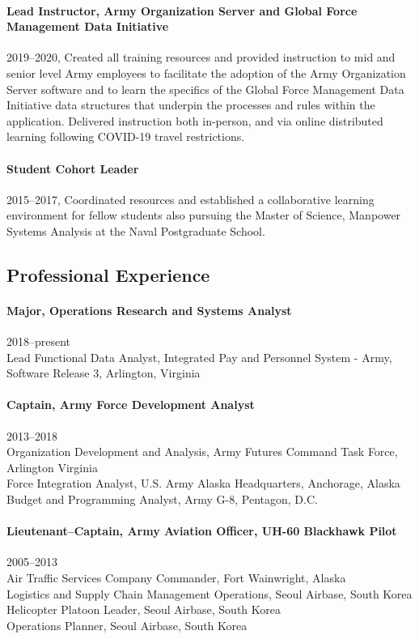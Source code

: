 \documentclass[12pt,letterpaper]{article}
\begin{document}
\paragraph{Lead Instructor, Army Organization Server and Global Force Management Data Initiative} 2019--2020, Created all training resources and provided instruction to mid and senior level Army employees to facilitate the adoption of the Army Organization Server software and to learn the specifics of the Global Force Management Data Initiative data structures that underpin the processes and rules within the application. Delivered instruction both in-person, and via online distributed learning following COVID-19 travel restrictions.
\paragraph{Student Cohort Leader}2015--2017, Coordinated resources and established a collaborative learning environment for fellow students also pursuing the Master of Science, Manpower Systems Analysis at the Naval Postgraduate School.
\subsection{Professional Experience} 
\paragraph{Major, Operations Research and Systems Analyst} 2018--present\\
Lead Functional Data Analyst, Integrated Pay and Personnel System - Army, Software Release 3, Arlington, Virginia
\paragraph{Captain, Army Force Development Analyst} 2013--2018\\
Organization Development and Analysis, Army Futures Command Task Force, Arlington Virginia\\
Force Integration Analyst, U.S. Army Alaska Headquarters, Anchorage, Alaska\\
Budget and Programming Analyst, Army G-8, Pentagon, D.C.
\paragraph{Lieutenant--Captain, Army Aviation Officer, UH-60 Blackhawk Pilot} 2005--2013\\
Air Traffic Services Company Commander, Fort Wainwright, Alaska\\
Logistics and Supply Chain Management Operations, Seoul Airbase, South Korea\\
Helicopter Platoon Leader, Seoul Airbase, South Korea\\
Operations Planner, Seoul Airbase, South Korea
\end{document}
